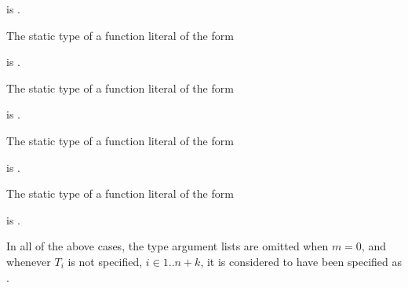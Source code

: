 \documentclass[makeidx]{article}
\begin{document}
{\noindent
\code{<\TypeParametersStd>}

\noindent
{}

\noindent
is
.
\EndCase

\LMHash{}%
The static type of a function literal of the form

\noindent
\code{<\TypeParametersStd>}

\noindent
{}

\noindent
is
\FunctionTypePositionalStdCr{\DYNAMIC}.
\EndCase

\LMHash{}%
The static type of a function literal of the form

\noindent
\code{<\TypeParametersStd>}

\noindent
{}

\noindent
is
.
\EndCase

\LMHash{}%
The static type of a function literal of the form

\noindent
\code{<\TypeParametersStd>}

\noindent
{}

\noindent
is
.
\EndCase

\LMHash{}%
The static type of a function literal of the form

\noindent
\code{<\TypeParametersStd>}

\noindent
{}

\noindent
is
.
\EndCase

\LMHash{}%
In all of the above cases,
the type argument lists are omitted when $m=0$,
and whenever $T_i$ is not specified, $i \in 1 .. n+k$,
it is considered to have been specified as \DYNAMIC.

}
\end{document}
